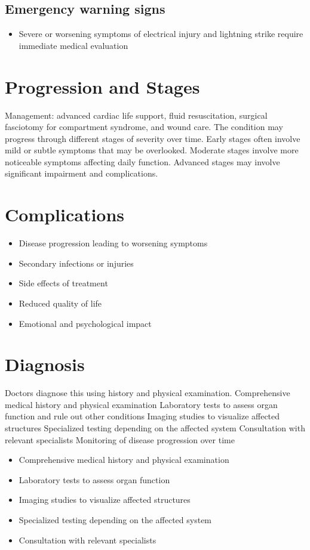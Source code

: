 \subsection{Emergency warning signs}
\begin{itemize}[noitemsep]
  \item Severe or worsening symptoms of electrical injury and lightning strike require immediate medical evaluation
\end{itemize}
\section{Progression and Stages}
Management: advanced cardiac life support, fluid resuscitation, surgical fasciotomy for compartment syndrome, and wound care. The condition may progress through different stages of severity over time. Early stages often involve mild or subtle symptoms that may be overlooked. Moderate stages involve more noticeable symptoms affecting daily function. Advanced stages may involve significant impairment and complications.
\section{Complications}
\begin{itemize}[noitemsep]
  \item Disease progression leading to worsening symptoms
  \item Secondary infections or injuries
  \item Side effects of treatment
  \item Reduced quality of life
  \item Emotional and psychological impact
\end{itemize}
\section{Diagnosis}
Doctors diagnose this using history and physical examination. Comprehensive medical history and physical examination Laboratory tests to assess organ function and rule out other conditions Imaging studies to visualize affected structures Specialized testing depending on the affected system Consultation with relevant specialists Monitoring of disease progression over time

\begin{itemize}[noitemsep]
  \item Comprehensive medical history and physical examination
  \item Laboratory tests to assess organ function
  \item Imaging studies to visualize affected structures
  \item Specialized testing depending on the affected system
  \item Consultation with relevant specialists
\end{itemize}
